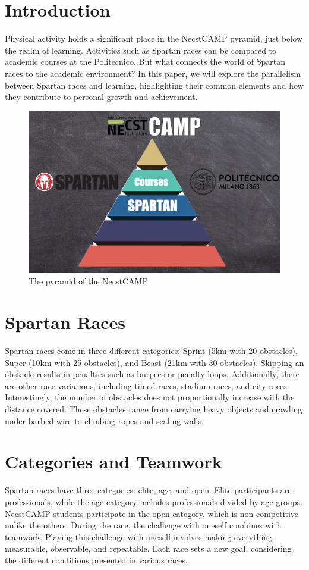 \documentclass[12pt,oneside,a4paper]{article}
\begin{document}
\section{Introduction} \label{sec:intro}
Physical activity holds a significant place in the NecstCAMP pyramid, just below the realm of learning. Activities such as Spartan races can be compared to academic courses at the Politecnico. But what connects the world of Spartan races to the academic environment? In this paper, we will explore the parallelism between Spartan races and learning, highlighting their common elements and how they contribute to personal growth and achievement.
\begin{figure}[h]
    \centering
    \includegraphics[width=.7\textwidth]{piramide.png}
    \caption{The pyramid of the NecstCAMP}
    \label{fig:my_label}
\end{figure}

\section{Spartan Races} \label{sec:spraces}
Spartan races come in three different categories: Sprint (5km with 20 obstacles), Super (10km with 25 obstacles), and Beast (21km with 30 obstacles). Skipping an obstacle results in penalties such as burpees or penalty loops. Additionally, there are other race variations, including timed races, stadium races, and city races. Interestingly, the number of obstacles does not proportionally increase with the distance covered. These obstacles range from carrying heavy objects and crawling under barbed wire to climbing ropes and scaling walls.

\section{Categories and Teamwork} \label{sec:cat}
Spartan races have three categories: elite, age, and open. Elite participants are professionals, while the age category includes professionals divided by age groups. NecstCAMP students participate in the open category, which is non-competitive unlike the others. During the race, the challenge with oneself combines with teamwork. Playing this challenge with oneself involves making everything measurable, observable, and repeatable. Each race sets a new goal, considering the different conditions presented in various races.
\end{document}
